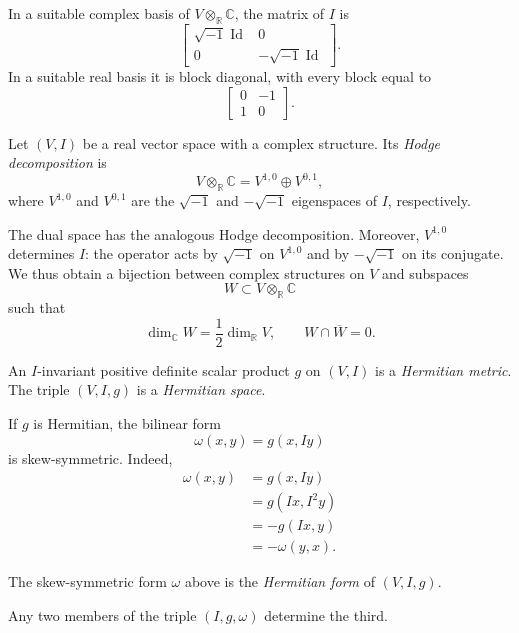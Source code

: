 In a suitable complex basis of
$V\otimes_{\mathbb{R}}\mathbb{C}$, the
matrix of $I$ is
$$
\begin{bmatrix}
\sqrt{-1}\operatorname{Id}&0\\
0&-\sqrt{-1}\operatorname{Id}
\end{bmatrix}.
$$
In a suitable real basis it is block
diagonal, with every block equal to
$$
\begin{bmatrix}
0&-1\\
1&0
\end{bmatrix}.
$$

\begin{definition}
\label{definition-vector-hodge}
Let $(V,I)$ be a real vector space with a
complex structure. Its
{\it Hodge decomposition} is
$$
V\otimes_{\mathbb{R}}\mathbb{C}
=V^{1,0}\oplus V^{0,1},
$$
where $V^{1,0}$ and $V^{0,1}$ are the
$\sqrt{-1}$ and $-\sqrt{-1}$
eigenspaces of $I$, respectively.
\end{definition}

The dual space has the analogous Hodge
decomposition. Moreover, $V^{1,0}$
determines $I$: the operator acts by
$\sqrt{-1}$ on $V^{1,0}$ and by
$-\sqrt{-1}$ on its conjugate. We thus
obtain a bijection between complex
structures on $V$ and subspaces
$$
W\subset V\otimes_{\mathbb{R}}\mathbb{C}
$$
such that
$$
\dim_{\mathbb{C}}W
=\frac{1}{2}\dim_{\mathbb{R}}V,
\qquad
W\cap\overline{W}=0.
$$

\begin{definition}
\label{definition-hermitian-metric-vector}
An $I$-invariant positive definite scalar
product $g$ on $(V,I)$ is a
{\it Hermitian metric}. The triple
$(V,I,g)$ is a {\it Hermitian space}.
\end{definition}

If $g$ is Hermitian, the bilinear form
$$
\omega(x,y)=g(x,Iy)
$$
is skew-symmetric. Indeed,
$$
\begin{aligned}
\omega(x,y)
&=g(x,Iy)\\
&=g(Ix,I^2y)\\
&=-g(Ix,y)\\
&=-\omega(y,x).
\end{aligned}
$$

\begin{definition}
\label{definition-hermitian-form-vector}
The skew-symmetric form $\omega$ above is
the {\it Hermitian form} of $(V,I,g)$.
\end{definition}

Any two members of the triple
$(I,g,\omega)$ determine the third.

